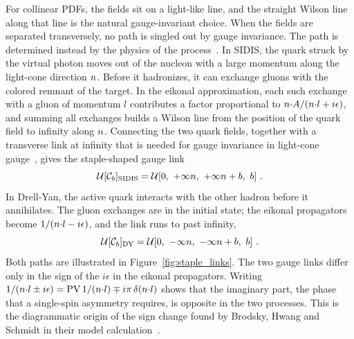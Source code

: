 For collinear PDFs, the fields sit on a light-like line, and the straight Wilson line along that line is the natural gauge-invariant choice. When the fields are separated transversely, no path is singled out by gauge invariance. The path is determined instead by the physics of the process~\cite{Collins:2002kn,Belitsky:2002sm,Boer:2003cm}. In SIDIS, the quark struck by the virtual photon moves out of the nucleon with a large momentum along the light-cone direction $n$. Before it hadronizes, it can exchange gluons with the colored remnant of the target. In the eikonal approximation, each such exchange with a gluon of momentum $l$ contributes a factor proportional to $n{\cdot} A/(n{\cdot} l + i\epsilon)$, and summing all exchanges builds a Wilson line from the position of the quark field to infinity along $n$. Connecting the two quark fields, together with a transverse link at infinity that is needed for gauge invariance in light-cone gauge~\cite{Belitsky:2002sm}, gives the staple-shaped gauge link
\begin{equation}
  \mathcal{U}[\mathcal{C}_b]_{\text{SIDIS}} = {\mathcal{U}}[0,\ +\infty n,\ +\infty n+b,\ b] \ .
  \label{eq:staple_sidis}
\end{equation}
In Drell-Yan, the active quark interacts with the other hadron before it annihilates. The gluon exchanges are in the initial state; the eikonal propagators become $1/(n{\cdot} l - i\epsilon)$, and the link runs to past infinity,
\begin{equation}
  \mathcal{U}[\mathcal{C}_b]_{\text{DY}} = {\mathcal{U}}[0,\ -\infty n,\ -\infty n+b,\ b] \ .
  \label{eq:staple_dy}
\end{equation}
Both paths are illustrated in Figure~\ref{fig:staple_links}. The two gauge links differ only in the sign of the $i\epsilon$ in the eikonal propagators. Writing $1/(n{\cdot} l\pm i\epsilon) = \mathrm{PV}\,1/(n{\cdot} l) \mp i\pi\,\delta(n{\cdot} l)$ shows that the imaginary part, the phase that a single-spin asymmetry requires, is opposite in the two processes. This is the diagrammatic origin of the sign change found by Brodsky, Hwang and Schmidt in their model calculation~\cite{Brodsky:2002cx,Brodsky:2002rv}.

